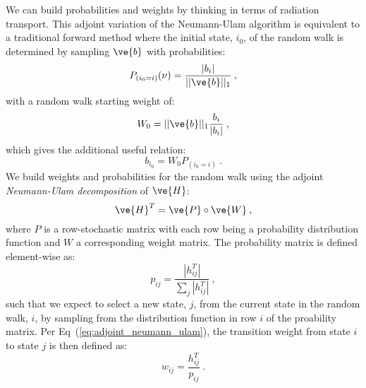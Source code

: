 \documentclass[letterpaper,11pt]{article}
\begin{document}
We can build probabilities and weights by thinking in terms of
radiation transport. This adjoint variation of the Neumann-Ulam
algorithm is equivalent to a traditional forward method where the
initial state, $i_0$, of the random walk is determined by sampling
$\ve{b}$ with probabilities:
\begin{equation}
  P_{(i_0=i)}(\nu) = \frac{|b_i|}{||\ve{b}||_1}\:,
  \label{eq:adjoint_source_probability}
\end{equation}
with a random walk starting weight of:
\begin{equation}
  W_0 = ||\ve{b}||_1 \frac{b_i}{|b_i|}\:,
  \label{eq:adjoint_starting_weight}
\end{equation}
which gives the additional useful relation:
\begin{equation}
  b_{i_0} = W_0 P_{(i_0=i)}\:.
  \label{eq:adjoint_source_definition}
\end{equation}
We build weights and probabilities for the random walk using the
adjoint \textit{Neumann-Ulam decomposition} of $\ve{H}$:
\begin{equation}
  \ve{H}^{T} = \ve{P} \circ \ve{W}\:,
  \label{eq:adjoint_neumann_ulam}
\end{equation}
where $P$ is a row-stochastic matrix with each row being a probability
distribution function and $W$ a corresponding weight matrix.  The
probability matrix is defined element-wise as:
\begin{equation}
  p_{ij} = \frac{|h^T_{ij}|}{\sum_j |h^T_{ij}|}\:,
  \label{eq:adjoint_probability}
\end{equation}
such that we expect to select a new state, $j$, from the current state
in the random walk, $i$, by sampling from the distribution function in
row $i$ of the proability matrix. Per
Eq~(\ref{eq:adjoint_neumann_ulam}), the transition weight from state
$i$ to state $j$ is then defined as:
\begin{equation}
  w_{ij} = \frac{h^T_{ij}}{p_{ij}}\:.
  \label{eq:adjoint_weight}
\end{equation}
\end{document}
